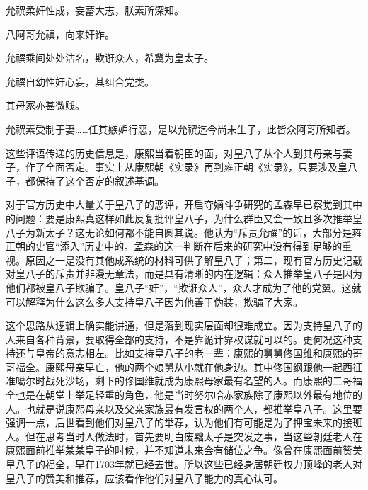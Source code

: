 \begin{bookquote}允禩柔奸性成，妄蓄大志，朕素所深知。\end{bookquote}


\begin{bookquote}八阿哥允禩，向来奸诈。\end{bookquote}


\begin{bookquote}允禩乘间处处沽名，欺诳众人，希冀为皇太子。\end{bookquote}


\begin{bookquote}允禩自幼性奸心妄，其纠合党类。\end{bookquote}


\begin{bookquote}其母家亦甚微贱。\end{bookquote}


\begin{bookquote}允禩素受制于妻……任其嫉妒行恶，是以允禩迄今尚未生子，此皆众阿哥所知者。\end{bookquote}


这些评语传递的历史信息是，康熙当着朝臣的面，对皇八子从个人到其母亲与妻子，作了全面否定。事实上从康熙朝《实录》再到雍正朝《实录》，只要涉及皇八子，都保持了这个否定的叙述基调。



对于官方历史中大量关于皇八子的恶评，开启夺嫡斗争研究的孟森早已察觉到其中的问题：要是康熙真这样如此反复批评皇八子，为什么群臣又会一致且多次推举皇八子为新太子？这无论如何都不能自圆其说。他认为“斥责允禩”的话，大部分是雍正朝的史官“添入”历史中的。孟森的这一判断在后来的研究中没有得到足够的重视。原因之一是没有其他成系统的材料可供了解皇八子；第二，现有官方历史记载对皇八子的斥责并非漫无章法，而是具有清晰的内在逻辑：众人推举皇八子是因为他们都被皇八子欺骗了。皇八子“奸”，“欺诳众人”，众人才成为了他的党翼。这就可以解释为什么这么多人支持皇八子因为他善于伪装，欺骗了大家。



这个思路从逻辑上确实能讲通，但是落到现实层面却很难成立。因为支持皇八子的人来自各种背景，要取得全部的支持，不是靠诡计靠权谋就可以的。更何况这种支持还与皇帝的意志相左。比如支持皇八子的老一辈：康熙的舅舅佟国维和康熙的哥哥福全。康熙母亲早亡，他的两个娘舅从小就在他身边。其中佟国纲跟他一起西征准噶尔时战死沙场，剩下的佟国维就成为康熙母家最有名望的人。而康熙的二哥福全也是在朝堂上举足轻重的角色，他是当时努尔哈赤家族除了康熙以外最有地位的人。也就是说康熙母亲以及父亲家族最有发言权的两个人，都推举皇八子。这里要强调一点，后世看到他们对皇八子的举荐，认为他们有可能是为了押宝未来的接班人。但在思考当时人做法时，首先要明白废黜太子是突发之事，当这些朝廷老人在康熙面前推举某某皇子的时候，并不知道未来会有储位之争。像曾在康熙面前赞美皇八子的福全，早在1703年就已经去世。所以这些已经身居朝廷权力顶峰的老人对皇八子的赞美和推荐，应该看作他们对皇八子能力的真心认可。


